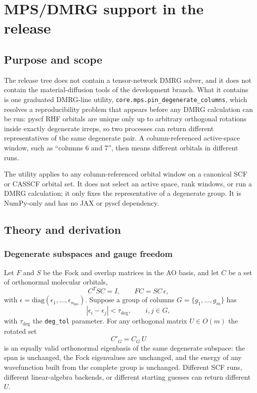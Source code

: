 \chapter{MPS/DMRG support in the release}
\label{ch:mps-support}

\section{Purpose and scope}

The release tree does not contain a tensor-network DMRG solver, and it
does not contain the material-diffusion tools of the development
branch.  What it contains is one graduated DMRG-line utility,
\texttt{core.mps.pin\_degenerate\_columns}, which resolves a
reproducibility problem that appears before any DMRG calculation can be
run: pyscf RHF orbitals are unique only up to arbitrary orthogonal
rotations inside exactly degenerate irreps, so two processes can return
different representatives of the same degenerate pair.  A
column-referenced active-space window, such as ``columns 6 and 7'', then
means different orbitals in different runs.

The utility applies to any column-referenced orbital window on a
canonical SCF or CASSCF orbital set.  It does not select an active
space, rank windows, or run a DMRG calculation; it only fixes the
representative of a degenerate group.  It is NumPy-only and has no JAX
or pyscf dependency.

\section{Theory and derivation}
\label{sec:pin-theory}

\subsection{Degenerate subspaces and gauge freedom}

Let $F$ and $S$ be the Fock and overlap matrices in the AO basis, and
let $C$ be a set of orthonormal molecular orbitals,
\begin{equation}
  C^{T}SC = I,
  \qquad
  F C = S C\,\epsilon,
  \label{eq:pin-eigen}
\end{equation}
with $\epsilon=\mathrm{diag}(\epsilon_1,\dots,\epsilon_{n_{\mathrm{mo}}})$.
Suppose a group of columns $G=\{g_1,\dots,g_m\}$ has
\begin{equation}
  |\epsilon_i-\epsilon_j|<\tau_{\mathrm{deg}},
  \qquad i,j\in G,
  \label{eq:pin-group}
\end{equation}
with $\tau_{\mathrm{deg}}$ the \texttt{deg\_tol} parameter.  For any
orthogonal matrix $U\in O(m)$ the rotated set
\begin{equation}
  C'_G = C_G\,U
  \label{eq:pin-rotation}
\end{equation}
is an equally valid orthonormal eigenbasis of the same degenerate
subspace: the span is unchanged, the Fock eigenvalues are unchanged,
and the energy of any wavefunction built from the complete group is
unchanged.  Different SCF runs, different linear-algebra backends, or
different starting guesses can return different $U$.

